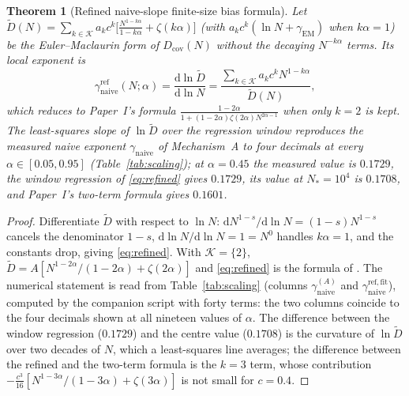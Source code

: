 \documentclass[11pt,reqno]{amsart}
\theoremstyle{plain}
\newtheorem{theorem}{Theorem}[section]
\theoremstyle{definition}
\theoremstyle{remark}
\numberwithin{equation}{section}
\newcommand{\dd}{\mathrm{d}}
\newcommand{\Dcov}{D_{\mathrm{cov}}}
\newcommand{\gnaive}{\gamma_{\mathrm{naive}}}
\newcommand{\gEM}{\gamma_{\mathrm{EM}}}
\begin{document}
\begin{theorem}[Refined naive-slope finite-size bias formula]\label{thm:refined}
Let $\widetilde D(N)=\sum_{k\in\mathcal K}a_kc^k\bigl[\frac{N^{1-k\alpha}}{1-k\alpha}+\zeta(k\alpha)\bigr]$ (with $a_kc^k(\ln N+\gEM)$ when $k\alpha=1$) be the Euler--Maclaurin form of $\Dcov(N)$ without the decaying $N^{-k\alpha}$ terms. Its local exponent is
\begin{equation}\label{eq:refined}
\gnaive^{\mathrm{ref}}(N;\alpha)=\frac{\dd\ln\widetilde D}{\dd\ln N}=\frac{\sum_{k\in\mathcal K}a_kc^kN^{1-k\alpha}}{\widetilde D(N)},
\end{equation}
which reduces to Paper~I's formula $\frac{1-2\alpha}{1+(1-2\alpha)\zeta(2\alpha)N^{2\alpha-1}}$ when only $k=2$ is kept. The least-squares slope of $\ln\widetilde D$ over the regression window reproduces the measured naive exponent $\gnaive$ of Mechanism~A to four decimals at every $\alpha\in[0.05,0.95]$ (Table~\ref{tab:scaling}); at $\alpha=0.45$ the measured value is $0.1729$, the window regression of \eqref{eq:refined} gives $0.1729$, its value at $N_*=10^4$ is $0.1708$, and Paper~I's two-term formula gives $0.1601$.
\end{theorem}

\begin{proof}
Differentiate $\widetilde D$ with respect to $\ln N$: $\dd N^{1-s}/\dd\ln N=(1-s)N^{1-s}$ cancels the denominator $1-s$, $\dd\ln N/\dd\ln N=1=N^{0}$ handles $k\alpha=1$, and the constants drop, giving \eqref{eq:refined}. With $\mathcal K=\{2\}$, $\widetilde D=A[N^{1-2\alpha}/(1-2\alpha)+\zeta(2\alpha)]$ and \eqref{eq:refined} is the formula of \cite[Thm.~4.1]{ChenChen2026I}. The numerical statement is read from Table~\ref{tab:scaling} (columns $\gnaive^{(A)}$ and $\gnaive^{\mathrm{ref,fit}}$), computed by the companion script with forty terms: the two columns coincide to the four decimals shown at all nineteen values of $\alpha$. The difference between the window regression ($0.1729$) and the centre value ($0.1708$) is the curvature of $\ln\widetilde D$ over two decades of $N$, which a least-squares line averages; the difference between the refined and the two-term formula is the $k=3$ term, whose contribution $-\frac{c^3}{16}[N^{1-3\alpha}/(1-3\alpha)+\zeta(3\alpha)]$ is not small for $c=0.4$.
\end{proof}
\end{document}
